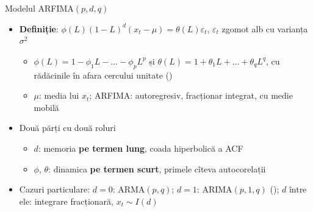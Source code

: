 \begin{frame}{Modelul ARFIMA$(p,d,q)$}
\itemsize{\small}
\begin{itemize}
    \item \textbf{Definiție}: $\phi(L)(1-L)^d(x_t - \mu) = \theta(L)\varepsilon_t$, $\varepsilon_t$ zgomot alb cu varianța $\sigma^2$
    \begin{itemize}
        \item $\phi(L) = 1 - \phi_1L - \dots - \phi_pL^p$ și $\theta(L) = 1 + \theta_1L + \dots + \theta_qL^q$, cu rădăcinile în afara cercului unitate ()
        \item $\mu$: media lui $x_t$; ARFIMA: autoregresiv, fracționar integrat, cu medie mobilă
    \end{itemize}
    \item Două părți cu două roluri
    \begin{itemize}
        \item $d$: memoria \textbf{pe termen lung}, coada hiperbolică a ACF
        \item $\phi$, $\theta$: dinamica \textbf{pe termen scurt}, primele cîteva autocorelații
    \end{itemize}
    \item Cazuri particulare: $d = 0$: ARMA$(p,q)$; $d = 1$: ARIMA$(p,1,q)$ (); $d$ între ele: integrare fracționară, $x_t \sim I(d)$
\end{itemize}
\end{frame}

